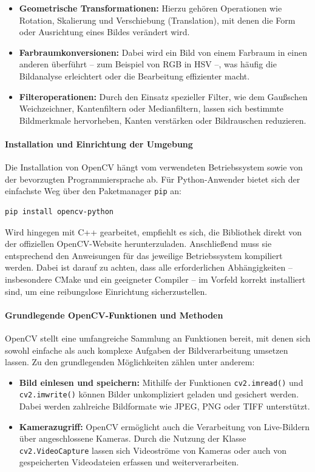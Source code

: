 \begin{itemize}
    \item \textbf{Geometrische Transformationen:} Hierzu gehören Operationen wie Rotation, Skalierung und Verschiebung (Translation), mit denen die Form oder Ausrichtung eines Bildes verändert wird.
    \item \textbf{Farbraumkonversionen:} Dabei wird ein Bild von einem Farbraum in einen anderen überführt – zum Beispiel von RGB in HSV –, was häufig die Bildanalyse erleichtert oder die Bearbeitung effizienter macht.
    \item \textbf{Filteroperationen:} Durch den Einsatz spezieller Filter, wie dem Gaußschen Weichzeichner, Kantenfiltern oder Medianfiltern, lassen sich bestimmte Bildmerkmale hervorheben, Kanten verstärken oder Bildrauschen reduzieren.
\end{itemize}

\paragraph{Installation und Einrichtung der Umgebung}
Die Installation von OpenCV hängt vom verwendeten Betriebssystem sowie von der bevorzugten Programmiersprache ab. Für Python-Anwender bietet sich der einfachste Weg über den Paketmanager \texttt{pip} an:

\begin{verbatim}
pip install opencv-python
\end{verbatim}

Wird hingegen mit C++ gearbeitet, empfiehlt es sich, die Bibliothek direkt von der offiziellen OpenCV-Website herunterzuladen. Anschließend muss sie entsprechend den Anweisungen für das jeweilige Betriebssystem kompiliert werden. Dabei ist darauf zu achten, dass alle erforderlichen Abhängigkeiten – insbesondere CMake und ein geeigneter Compiler – im Vorfeld korrekt installiert sind, um eine reibungslose Einrichtung sicherzustellen.

\paragraph{Grundlegende OpenCV-Funktionen und Methoden}
OpenCV stellt eine umfangreiche Sammlung an Funktionen bereit, mit denen sich sowohl einfache als auch komplexe Aufgaben der Bildverarbeitung umsetzen lassen. Zu den grundlegenden Möglichkeiten zählen unter anderem:

\begin{itemize}
    \item \textbf{Bild einlesen und speichern:} Mithilfe der Funktionen \texttt{cv2.imread()} und \texttt{cv2.imwrite()} können Bilder unkompliziert geladen und gesichert werden. Dabei werden zahlreiche Bildformate wie JPEG, PNG oder TIFF unterstützt.
    \item \textbf{Kamerazugriff:} OpenCV ermöglicht auch die Verarbeitung von Live-Bildern über angeschlossene Kameras. Durch die Nutzung der Klasse \texttt{cv2.VideoCapture} lassen sich Videoströme von Kameras oder auch von gespeicherten Videodateien erfassen und weiterverarbeiten.
\end{itemize}


